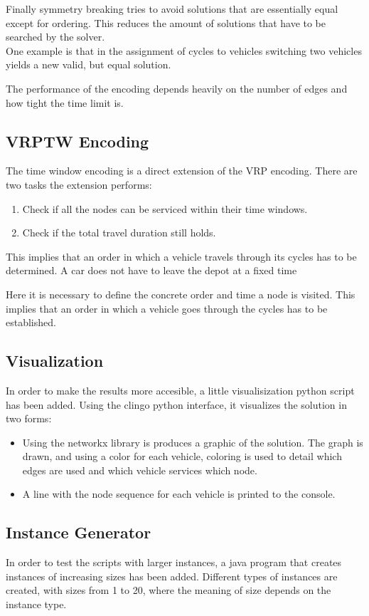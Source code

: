 \documentclass[12pt, letterpaper]{article}
\begin{document}
Finally symmetry breaking tries to avoid solutions that are essentially equal except for ordering. This reduces the amount of solutions that have to be searched by the solver.\\
One example is that in the assignment of cycles to vehicles switching two vehicles yields a new valid, but equal solution.

The performance of the encoding depends heavily on the number of edges and how tight the time limit is.

\subsection{VRPTW Encoding}
The time window encoding is a direct extension of the VRP encoding. There are two tasks the extension performs:
\begin{enumerate}
	\item Check if all the nodes can be serviced within their time windows.
	\item Check if the total travel duration still holds.
\end{enumerate}

This implies that an order in which a vehicle travels through its cycles has to be determined. A car does not have to leave the depot at a fixed time

Here it is necessary to define the concrete order and time a node is visited. This implies that an order in which a vehicle goes through the cycles has to be established.\\


\subsection{Visualization}
In order to make the results more accesible, a little visualisization python script has been added. Using the clingo python interface, it visualizes the solution in two forms:
\begin{itemize}
	\item Using the networkx \cite{networkx} library is produces a graphic of the solution. The graph is drawn, and using a color for each vehicle, coloring is used to detail which edges are used and which vehicle services which node.
	\item A line with the node sequence for each vehicle is printed to the console.
\end{itemize}


\subsection{Instance Generator}
In order to test the scripts with larger instances, a java program that creates instances of increasing sizes has been added. Different types of instances are created, with sizes from 1 to 20, where the meaning of size depends on the instance type.
\end{document}
